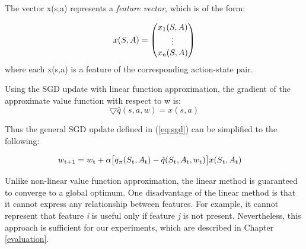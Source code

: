 \documentclass[11pt,twoside]{report}
\theoremstyle{plain}
\theoremstyle{definition}
\DeclareMathOperator{\E}{\mathbb{E}}
\begin{document}
The vector x(s,a) represents a \textit{feature vector}, which is of the form:

\begin{equation}
x(S, A) = \begin{pmatrix} x\textsubscript{1}(S, A) \\ \vdots \\ x\textsubscript{n}(S, A)  \end{pmatrix}
\end{equation}
where each x(s,a) is a feature of the corresponding action-state pair.

Using the SGD update with linear function approximation, the gradient of the approximate value function with respect to w is:
\begin{equation}
\bigtriangledown \hat{q}(s, a,w) = x(s, a)
\end{equation}

Thus the general SGD update defined in (\ref{eq:sgd}) can be simplified to the following:

\begin{equation}\label{eq:sgd_linear}
\begin{split}
w\textsubscript{t+1} & = w\textsubscript{t} +  \alpha  \big[ q\textsubscript{$\pi$}(S\textsubscript{t}, A\textsubscript{t}) - \hat{q}(S\textsubscript{t}, A\textsubscript{t}, w\textsubscript{t}) \big] x(S\textsubscript{t}, A\textsubscript{t})
\end{split}
\end{equation}

Unlike non-linear value function approximation, the linear method is guaranteed to converge to a global optimum.
One disadvantage of the linear method is that it cannot express any relationship between features. For example, it cannot represent that feature \textit{i} is useful only if feature \textit{j} is not present.
Nevertheless,  this approach is sufficient for our experiments, which are described in Chapter \ref{evaluation}.
\end{document}
